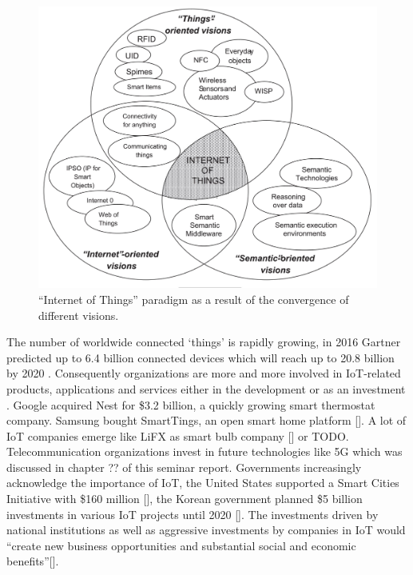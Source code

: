 	\begin{figure}[h]
	    \begin{center}
	    \includegraphics[scale=0.35]{Talk11/iot_visions.jpg}
	    \end{center}
	    \caption{``Internet of Things'' paradigm as a result of the convergence of different visions.}
	    \label{``Internet of Things'' visions}
    \end{figure}

	The number of worldwide connected `things' is rapidly growing, in 2016 Gartner predicted up to 6.4 billion connected devices which will reach up to 20.8 billion by 2020 \cite{gartner}. Consequently organizations are more and more involved in IoT-related products, applications and services either in the development or as an investment \cite{ju}. Google acquired Nest for \$3.2 billion, a quickly growing smart thermostat company. Samsung bought SmartTings, an open smart home platform []. A lot of IoT companies emerge like LiFX as smart bulb company [] or TODO. Telecommunication organizations invest in future technologies like 5G which was discussed in chapter ?? of this seminar report. Governments increasingly acknowledge the importance of IoT, the United States supported a Smart Cities Initiative with \$160 million [], the Korean government planned \$5 billion investments in various IoT projects until 2020 []. The investments driven by national institutions as well as aggressive investments by companies in IoT would ``create new business opportunities and substantial social and economic benefits''[]. 

